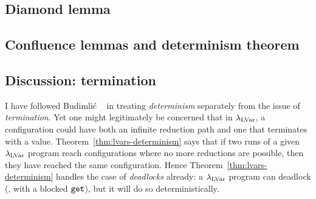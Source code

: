 
\LVarsLemErrorPreservation


\subsection{Diamond lemma}

\LVarsLemDiamond


\subsection{Confluence lemmas and determinism theorem}

\LVarsCorStrongLocalConfluence


\LVarsLemStrongOneSidedConfluence



\LVarsLemStrongConfluence



\LVarsLemConfluence


\LVarsThmDeterminism


\subsection{Discussion: termination}

I have followed Budimli\'c \etal~\cite{CnC} in treating
\emph{determinism} separately from the issue of \emph{termination}.
Yet one might legitimately be concerned that in $\lambda_{\textrm{LVar}}$, a
configuration could have both an infinite reduction path and one that
terminates with a value.  Theorem~\ref{thm:lvars-determinism} says
that if two runs of a given $\lambda_{\textrm{LVar}}$ program reach configurations
where no more reductions are possible, then they have reached the same
configuration.  Hence Theorem~\ref{thm:lvars-determinism} handles the
case of \emph{deadlocks} already: a $\lambda_{\textrm{LVar}}$ program can deadlock
(\eg, with a blocked $\mbox{\texttt{get}}$), but it will do so deterministically.

